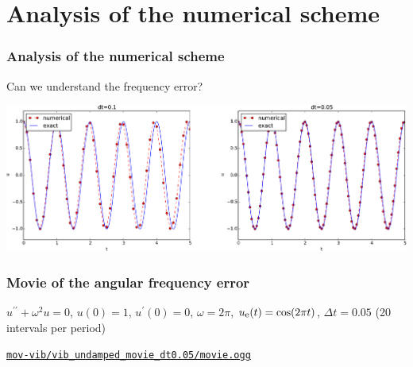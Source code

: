 \documentclass{beamer}
\newenvironment{doconce:movie}{}{}
\newcounter{doconce:movie:counter}
\begin{document}
\section{Analysis of the numerical scheme}

\begin{frame}
\frametitle{Analysis of the numerical scheme}

\label{vib:model1:analysis}


\begin{center}
\begin{Sbox}
\begin{minipage}{0.85\linewidth}
Can we understand the frequency error?
\end{minipage}
\end{Sbox}
\fbox{\TheSbox}
\end{center}



\centerline{\includegraphics[width=1.0\linewidth]{fig-vib/vib_freq_err1.pdf}}




\end{frame}

\begin{frame}
\frametitle{Movie of the angular frequency error}

$u^{\prime\prime} + \omega^2 u = 0$, $u(0)=1$, $u^{\prime}(0)=0$,
$\omega=2\pi$, $\uex(t)=\cos (2\pi t)$, $\Delta t = 0.05$ (20 intervals
per period)


\vspace{3mm}




\begin{doconce:movie}
\begin{center}
\href{run:mov-vib/vib_undamped_movie_dt0.05/movie.ogg}{\nolinkurl{mov-vib/vib_undamped_movie_dt0.05/movie.ogg}}
\end{center}
\end{doconce:movie}
\end{frame}
\end{document}
